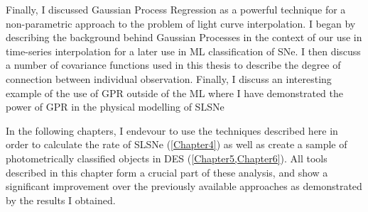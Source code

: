 Finally, I discussed Gaussian Process Regression as a powerful technique for a non-parametric approach to the problem of light curve interpolation. I began by describing the background behind Gaussian Processes in the context of our use in time-series interpolation for a later use in ML classification of SNe. I then discuss a number of covariance functions used in this thesis to describe the degree of connection between individual observation. Finally, I discuss an interesting example of the use of GPR outside of the ML where I have demonstrated the power of GPR in the physical modelling of SLSNe

In the following chapters, I endevour to use the techniques described here in order to calculate the rate of SLSNe (\cref{Chapter4}) as well as create a sample of photometrically classified objects in DES (\cref{Chapter5,Chapter6}). All tools described in this chapter form a crucial part of these analysis, and show a significant improvement over the previously available approaches as demonstrated by the results I obtained.
